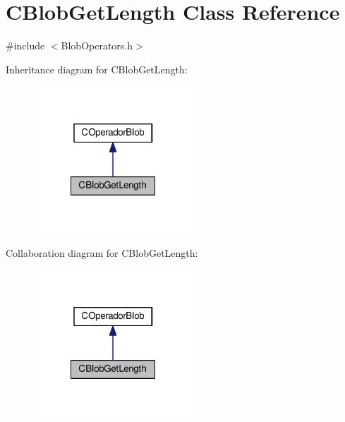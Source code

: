 \hypertarget{classCBlobGetLength}{\section{C\-Blob\-Get\-Length Class Reference}
\label{classCBlobGetLength}
}


{\ttfamily \#include $<$Blob\-Operators.\-h$>$}



Inheritance diagram for C\-Blob\-Get\-Length\-:\nopagebreak
\begin{figure}[H]
\begin{center}
\leavevmode
\includegraphics[width=168pt]{classCBlobGetLength__inherit__graph}
\end{center}
\end{figure}


Collaboration diagram for C\-Blob\-Get\-Length\-:\nopagebreak
\begin{figure}[H]
\begin{center}
\leavevmode
\includegraphics[width=168pt]{classCBlobGetLength__coll__graph}
\end{center}
\end{figure}
